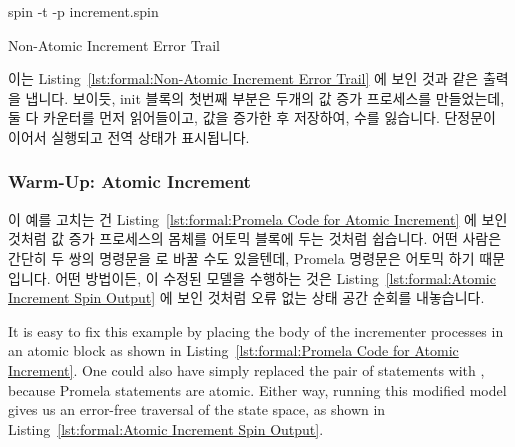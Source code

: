 \fi

\begin{VerbatimU}
spin -t -p increment.spin
\end{VerbatimU}

\begin{listing*}[htbp]
\vspace*{-9pt}
\caption{Non-Atomic Increment Error Trail}
\label{lst:formal:Non-Atomic Increment Error Trail}
\end{listing*}

이는
Listing~\ref{lst:formal:Non-Atomic Increment Error Trail}
에 보인 것과 같은 출력을 냅니다.
보이듯, init 블록의 첫번째 부분은 두개의 값 증가 프로세스를 만들었는데, 둘 다
카운터를 먼저 읽어들이고, 값을 증가한 후 저장하여, 수를 잃습니다.
단정문이 이어서 실행되고 전역 상태가 표시됩니다.

\iffalse

This gives the output shown in
Listing~\ref{lst:formal:Non-Atomic Increment Error Trail}.
As can be seen, the first portion of the init block created both
incrementer processes, both of which first fetched the counter,
then both incremented and stored it, losing a count.
The assertion then triggered, after which the global state is displayed.

\fi

\subsubsection{Warm-Up: Atomic Increment}
\label{sec:formal:Warm-Up: Atomic Increment}

이 예를 고치는 건
Listing~\ref{lst:formal:Promela Code for Atomic Increment} 에 보인 것처럼 값
증가 프로세스의 몸체를 어토믹 블록에 두는 것처럼 쉽습니다.
어떤 사람은 간단히 두 쌍의 명령문을  로 바꿀 수도
있을텐데, Promela 명령문은 어토믹 하기 때문입니다.
어떤 방법이든, 이 수정된 모델을 수행하는 것은
Listing~\ref{lst:formal:Atomic Increment Spin Output} 에 보인 것처럼 오류 없는
상태 공간 순회를 내놓습니다.

\iffalse

It is easy to fix this example by placing the body of the incrementer
processes in an atomic block as shown in
Listing~\ref{lst:formal:Promela Code for Atomic Increment}.
One could also have simply replaced the pair of statements with
, because Promela statements are
atomic.
Either way, running this modified model gives us an error-free traversal
of the state space, as shown in
Listing~\ref{lst:formal:Atomic Increment Spin Output}.

